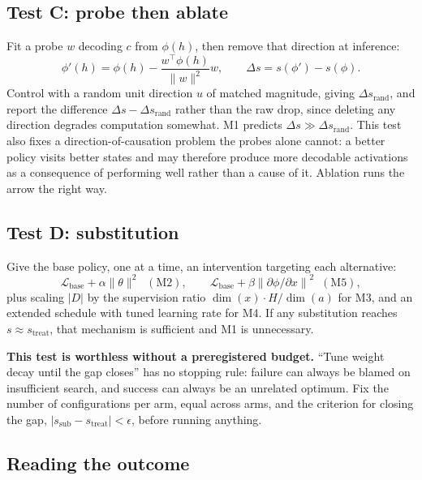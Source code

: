 \documentclass[9pt]{extarticle}
\begin{document}
\subsection{Test C: probe then ablate}

Fit a probe $w$ decoding $c$ from $\phi(h)$, then remove that direction at inference:
\[
\phi'(h) = \phi(h) - \frac{w^\top \phi(h)}{\|w\|^2} w, \qquad \Delta s = s(\phi') - s(\phi).
\]
Control with a random unit direction $u$ of matched magnitude, giving $\Delta s_{\text{rand}}$, and report the difference $\Delta s - \Delta s_{\text{rand}}$ rather than the raw drop, since deleting any direction degrades computation somewhat. M1 predicts $\Delta s \gg \Delta s_{\text{rand}}$. This test also fixes a direction-of-causation problem the probes alone cannot: a better policy visits better states and may therefore produce more decodable activations as a consequence of performing well rather than a cause of it. Ablation runs the arrow the right way.

\subsection{Test D: substitution}

Give the base policy, one at a time, an intervention targeting each alternative:
\[
\mathcal{L}_{\text{base}} + \alpha\|\theta\|^2 \;\;(\text{M2}), \qquad
\mathcal{L}_{\text{base}} + \beta\left\|\partial\phi/\partial x\right\|^2 \;\;(\text{M5}),
\]
plus scaling $|D|$ by the supervision ratio $\dim(x)\cdot H / \dim(a)$ for M3, and an extended schedule with tuned learning rate for M4. If any substitution reaches $s \approx s_{\text{treat}}$, that mechanism is sufficient and M1 is unnecessary.

\textbf{This test is worthless without a preregistered budget.} ``Tune weight decay until the gap closes'' has no stopping rule: failure can always be blamed on insufficient search, and success can always be an unrelated optimum. Fix the number of configurations per arm, equal across arms, and the criterion for closing the gap, $|s_{\text{sub}} - s_{\text{treat}}| < \epsilon$, before running anything.

\subsection{Reading the outcome}
\end{document}
